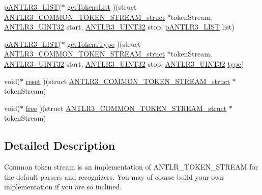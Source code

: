 \begin{DoxyCompactItemize}
\item 
\hyperlink{antlr3interfaces_8h_ae2fcb7565c1f2a85d99e61299f33fbf1}{p\-A\-N\-T\-L\-R3\-\_\-\-L\-I\-S\-T}($\ast$ \hyperlink{struct_a_n_t_l_r3___c_o_m_m_o_n___t_o_k_e_n___s_t_r_e_a_m__struct_a6aab126893e96d0e0ca8c36450e908de}{get\-Tokens\-List} )(struct \hyperlink{struct_a_n_t_l_r3___c_o_m_m_o_n___t_o_k_e_n___s_t_r_e_a_m__struct}{A\-N\-T\-L\-R3\-\_\-\-C\-O\-M\-M\-O\-N\-\_\-\-T\-O\-K\-E\-N\-\_\-\-S\-T\-R\-E\-A\-M\-\_\-struct} $\ast$token\-Stream, \hyperlink{antlr3defs_8h_ac41f744abd0fd25144b9eb9d11b1dfd1}{A\-N\-T\-L\-R3\-\_\-\-U\-I\-N\-T32} start, \hyperlink{antlr3defs_8h_ac41f744abd0fd25144b9eb9d11b1dfd1}{A\-N\-T\-L\-R3\-\_\-\-U\-I\-N\-T32} stop, \hyperlink{antlr3interfaces_8h_ae2fcb7565c1f2a85d99e61299f33fbf1}{p\-A\-N\-T\-L\-R3\-\_\-\-L\-I\-S\-T} list)
\item 
\hyperlink{antlr3interfaces_8h_ae2fcb7565c1f2a85d99e61299f33fbf1}{p\-A\-N\-T\-L\-R3\-\_\-\-L\-I\-S\-T}($\ast$ \hyperlink{struct_a_n_t_l_r3___c_o_m_m_o_n___t_o_k_e_n___s_t_r_e_a_m__struct_a530543c21759c2e6f1fd0283a7d52671}{get\-Tokens\-Type} )(struct \hyperlink{struct_a_n_t_l_r3___c_o_m_m_o_n___t_o_k_e_n___s_t_r_e_a_m__struct}{A\-N\-T\-L\-R3\-\_\-\-C\-O\-M\-M\-O\-N\-\_\-\-T\-O\-K\-E\-N\-\_\-\-S\-T\-R\-E\-A\-M\-\_\-struct} $\ast$token\-Stream, \hyperlink{antlr3defs_8h_ac41f744abd0fd25144b9eb9d11b1dfd1}{A\-N\-T\-L\-R3\-\_\-\-U\-I\-N\-T32} start, \hyperlink{antlr3defs_8h_ac41f744abd0fd25144b9eb9d11b1dfd1}{A\-N\-T\-L\-R3\-\_\-\-U\-I\-N\-T32} stop, \hyperlink{antlr3defs_8h_ac41f744abd0fd25144b9eb9d11b1dfd1}{A\-N\-T\-L\-R3\-\_\-\-U\-I\-N\-T32} \hyperlink{convert2cfg_8m_a2902a7a983ab04c79cae2162ad553481}{type})
\item 
void($\ast$ \hyperlink{struct_a_n_t_l_r3___c_o_m_m_o_n___t_o_k_e_n___s_t_r_e_a_m__struct_ada755310e5f119666289a36ba8a9f0ce}{reset} )(struct \hyperlink{struct_a_n_t_l_r3___c_o_m_m_o_n___t_o_k_e_n___s_t_r_e_a_m__struct}{A\-N\-T\-L\-R3\-\_\-\-C\-O\-M\-M\-O\-N\-\_\-\-T\-O\-K\-E\-N\-\_\-\-S\-T\-R\-E\-A\-M\-\_\-struct} $\ast$token\-Stream)
\item 
void($\ast$ \hyperlink{struct_a_n_t_l_r3___c_o_m_m_o_n___t_o_k_e_n___s_t_r_e_a_m__struct_a062b7949ea434d5a82cf1a07a3f8c7ff}{free} )(struct \hyperlink{struct_a_n_t_l_r3___c_o_m_m_o_n___t_o_k_e_n___s_t_r_e_a_m__struct}{A\-N\-T\-L\-R3\-\_\-\-C\-O\-M\-M\-O\-N\-\_\-\-T\-O\-K\-E\-N\-\_\-\-S\-T\-R\-E\-A\-M\-\_\-struct} $\ast$token\-Stream)
\end{DoxyCompactItemize}


\subsection{Detailed Description}
Common token stream is an implementation of A\-N\-T\-L\-R\-\_\-\-T\-O\-K\-E\-N\-\_\-\-S\-T\-R\-E\-A\-M for the default parsers and recognizers. You may of course build your own implementation if you are so inclined. 

